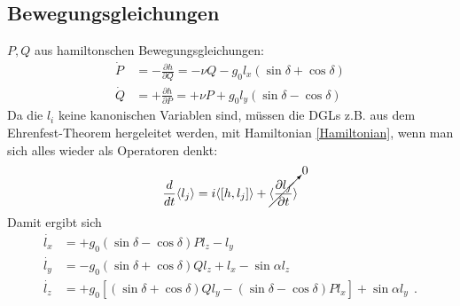 \subsection{Bewegungsgleichungen}
$P,Q$ aus hamiltonschen Bewegungsgleichungen:
\begin{align*}
  \dot{P} &= - \frac{\partial h}{\partial Q} = - \nu Q - g_0 l_x (\sin\delta + \cos\delta)\\
  \dot{Q} &= + \frac{\partial h}{\partial P} = + \nu P + g_0 l_y (\sin\delta - \cos\delta) 
\end{align*}
Da die $l_i$ keine kanonischen Variablen sind, müssen die DGLs z.B. aus dem Ehrenfest-Theorem hergeleitet werden, mit Hamiltonian \eqref{Hamiltonian}, wenn man sich alles wieder als Operatoren denkt:
\begin{equation*}
  \frac{d}{dt}\langle l_j \rangle = i \langle[h,l_j]\rangle + \cancelto{0}{\langle\frac{\partial l_j}{\partial t}\rangle}
\end{equation*}
Damit ergibt sich
\begin{align*}
  \dot{l_x} &= + g_0 (\sin\delta - \cos\delta) P l_z - l_y\\
  \dot{l_y} &= - g_0 (\sin\delta + \cos\delta) Q l_z  + l_x -\sin\alpha l_z\\
  \dot{l_z} &= + g_0 \left[ (\sin\delta + \cos\delta) Q l_y - (\sin\delta - \cos\delta)P l_x\right] + \sin\alpha l_y~~.
\end{align*}
